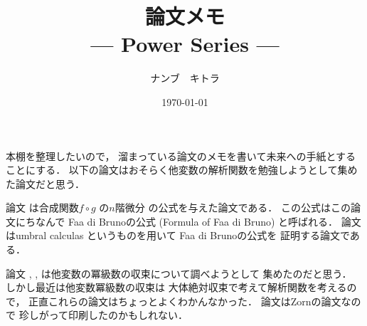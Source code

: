 \documentclass[leqno, a4paper, 12pt]{jsarticle}
\title{論文メモ
\large{\\--- Power Series ---}
}
\author{ナンブ　キトラ}
\date{\today}
\begin{document}
\maketitle

本棚を整理したいので，
溜まっている論文のメモを書いて未来への手紙とすることにする．
以下の論文はおそらく他変数の解析関数を勉強しようとして集めた論文だと思う．

論文
\cite{di1857note}
は合成関数$f\circ g$
の$n$階微分
の公式を与えた論文である．
この公式はこの論文にちなんで
Faa di Brunoの公式
(Formula of Faa di Bruno)
と呼ばれる．
論文
\cite{MR0602839}
はumbral calculas 
というものを用いて
Faa di Brunoの公式を
証明する論文である．


論文
\cite{MR0021131}, 
\cite{MR0021977}, 
\cite{MR0704536}
は他変数の冪級数の収束について調べようとして
集めたのだと思う．
しかし最近は他変数冪級数の収束は
大体絶対収束で考えて解析関数を考えるので，
正直これらの論文はちょっとよくわかんなかった．
論文\cite{MR0021977}はZornの論文なので
珍しがって印刷したのかもしれない．

\nocite{*}


\end{document}
